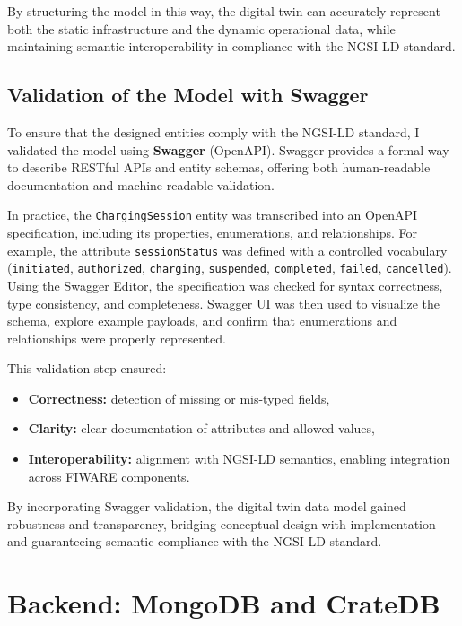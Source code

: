 By structuring the model in this way, the digital twin can accurately represent both the static infrastructure and the dynamic operational data, while maintaining semantic interoperability in compliance with the NGSI-LD standard.


\subsection*{Validation of the Model with Swagger}

To ensure that the designed entities comply with the NGSI-LD standard, I validated the model using \textbf{Swagger} (OpenAPI). Swagger provides a formal way to describe RESTful APIs and entity schemas, offering both human-readable documentation and machine-readable validation.

In practice, the \texttt{ChargingSession} entity was transcribed into an OpenAPI specification, including its properties, enumerations, and relationships. For example, the attribute \texttt{sessionStatus} was defined with a controlled vocabulary (\texttt{initiated}, \texttt{authorized}, \texttt{charging}, \texttt{suspended}, \texttt{completed}, \texttt{failed}, \texttt{cancelled}). Using the Swagger Editor, the specification was checked for syntax correctness, type consistency, and completeness. Swagger UI was then used to visualize the schema, explore example payloads, and confirm that enumerations and relationships were properly represented.

This validation step ensured:
\begin{itemize}
    \item \textbf{Correctness:} detection of missing or mis-typed fields,
    \item \textbf{Clarity:} clear documentation of attributes and allowed values,
    \item \textbf{Interoperability:} alignment with NGSI-LD semantics, enabling integration across FIWARE components.
\end{itemize}

By incorporating Swagger validation, the digital twin data model gained robustness and transparency, bridging conceptual design with implementation and guaranteeing semantic compliance with the NGSI-LD standard.

\section{Backend: MongoDB and CrateDB}

